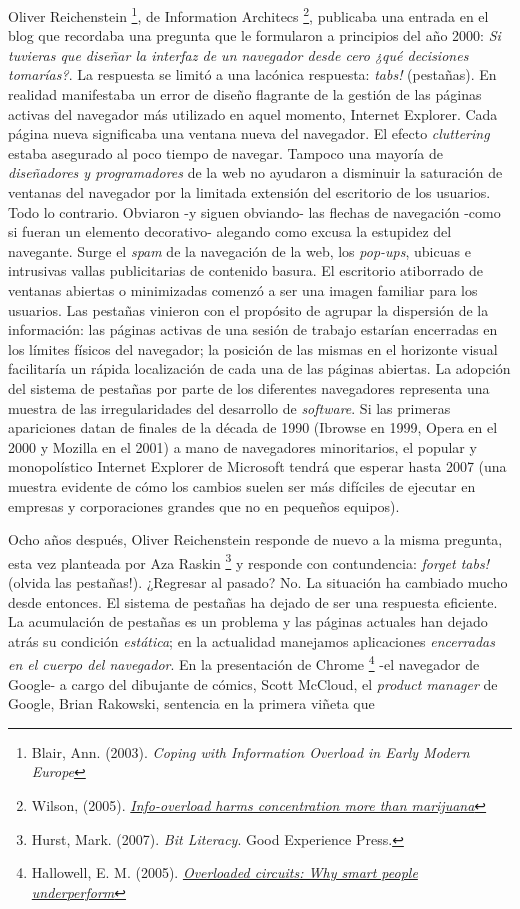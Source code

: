 \documentclass[12pt, a4paper,twoside]{book}
\begin{document}
Oliver Reichenstein%
\footnote{Blair, Ann. (2003).
\emph{Coping with Information Overload in Early Modern Europe}},
de Information Architecs%
\footnote{Wilson, (2005).
\emph{\href{http://www.newscientist.com/article/mg18624973.400}{Info-overload harms concentration more than marijuana}}},
publicaba una entrada en el blog que recordaba una pregunta que le
formularon a principios del año 2000:
\emph{Si tuvieras que diseñar la interfaz de un navegador desde cero ¿qué decisiones tomarías?}.
La respuesta se limitó a una lacónica respuesta: \emph{tabs!}
(pestañas). En realidad manifestaba un error de diseño flagrante de
la gestión de las páginas activas del navegador más utilizado en
aquel momento, Internet Explorer. Cada página nueva significaba una
ventana nueva del navegador. El efecto \emph{cluttering} estaba
asegurado al poco tiempo de navegar. Tampoco una mayoría de
\emph{diseñadores y programadores} de la web no ayudaron a
disminuir la saturación de ventanas del navegador por la limitada
extensión del escritorio de los usuarios. Todo lo contrario.
Obviaron -y siguen obviando- las flechas de navegación -como si
fueran un elemento decorativo- alegando como excusa la estupidez
del navegante. Surge el \emph{spam} de la navegación de la web, los
\emph{pop-ups}, ubicuas e intrusivas vallas publicitarias de
contenido basura. El escritorio atiborrado de ventanas abiertas o
minimizadas comenzó a ser una imagen familiar para los usuarios.
Las pestañas vinieron con el propósito de agrupar la dispersión de
la información: las páginas activas de una sesión de trabajo
estarían encerradas en los límites físicos del navegador; la
posición de las mismas en el horizonte visual facilitaría un rápida
localización de cada una de las páginas abiertas. La adopción del
sistema de pestañas por parte de los diferentes navegadores
representa una muestra de las irregularidades del desarrollo de
\emph{software}. Si las primeras apariciones datan de finales de la
década de 1990 (Ibrowse en 1999, Opera en el 2000 y Mozilla en el
2001) a mano de navegadores minoritarios, el popular y
monopolístico Internet Explorer de Microsoft tendrá que esperar
hasta 2007 (una muestra evidente de cómo los cambios suelen ser más
difíciles de ejecutar en empresas y corporaciones grandes que no en
pequeños equipos).

Ocho años después, Oliver Reichenstein responde de nuevo a la misma
pregunta, esta vez planteada por Aza Raskin%
\footnote{Hurst, Mark. (2007). \emph{Bit Literacy}. Good Experience Press.}
y responde con contundencia: \emph{forget tabs!} (olvida las
pestañas!). ¿Regresar al pasado? No. La situación ha cambiado mucho
desde entonces. El sistema de pestañas ha dejado de ser una
respuesta eficiente. La acumulación de pestañas es un problema y
las páginas actuales han dejado atrás su condición \emph{estática};
en la actualidad manejamos aplicaciones
\emph{encerradas en el cuerpo del navegador}. En la presentación de
Chrome%
\footnote{Hallowell, E. M. (2005).
\emph{\href{http://tr.im/wSsS}{Overloaded circuits: Why smart people underperform}}}
-el navegador de Google- a cargo del dibujante de cómics, Scott
McCloud, el \emph{product manager} de Google, Brian Rakowski,
sentencia en la primera viñeta que
\end{document}
